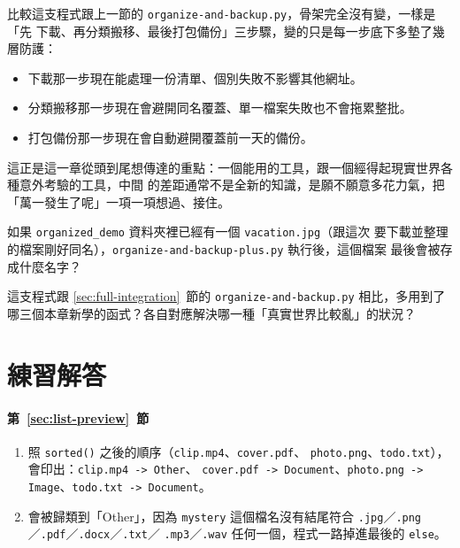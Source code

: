 比較這支程式跟上一節的 \texttt{organize-and-backup.py}，骨架完全沒有變，一樣是「先
下載、再分類搬移、最後打包備份」三步驟，變的只是每一步底下多墊了幾層防護：

\begin{itemize}
\item 下載那一步現在能處理一份清單、個別失敗不影響其他網址。
\item 分類搬移那一步現在會避開同名覆蓋、單一檔案失敗也不會拖累整批。
\item 打包備份那一步現在會自動避開覆蓋前一天的備份。
\end{itemize}

這正是這一章從頭到尾想傳達的重點：一個能用的工具，跟一個經得起現實世界各種意外考驗的工具，中間
的差距通常不是全新的知識，是願不願意多花力氣，把「萬一發生了呢」一項一項想過、接住。

\begin{drills}[label=drills:advanced-integration]
\item 如果 \texttt{organized\_demo} 資料夾裡已經有一個 \texttt{vacation.jpg}（跟這次
要下載並整理的檔案剛好同名），\texttt{organize-and-backup-plus.py} 執行後，這個檔案
最後會被存成什麼名字？
\item 這支程式跟 \ref{sec:full-integration}~節的 \texttt{organize-and-backup.py}
相比，多用到了哪三個本章新學的函式？各自對應解決哪一種「真實世界比較亂」的狀況？
\end{drills}

\section*{練習解答}

\paragraph{第~\ref{sec:list-preview}~節}
\begin{enumerate}
\item 照 \texttt{sorted()} 之後的順序（\texttt{clip.mp4}、\texttt{cover.pdf}、
\texttt{photo.png}、\texttt{todo.txt}），會印出：\texttt{clip.mp4 -> Other}、
\texttt{cover.pdf -> Document}、\texttt{photo.png -> Image}、\texttt{todo.txt -> Document}。
\item 會被歸類到「Other」，因為 \texttt{mystery} 這個檔名沒有結尾符合
\texttt{.jpg}／\texttt{.png}／\texttt{.pdf}／\texttt{.docx}／\texttt{.txt}／
\texttt{.mp3}／\texttt{.wav} 任何一個，程式一路掉進最後的 \texttt{else}。
\end{enumerate}

